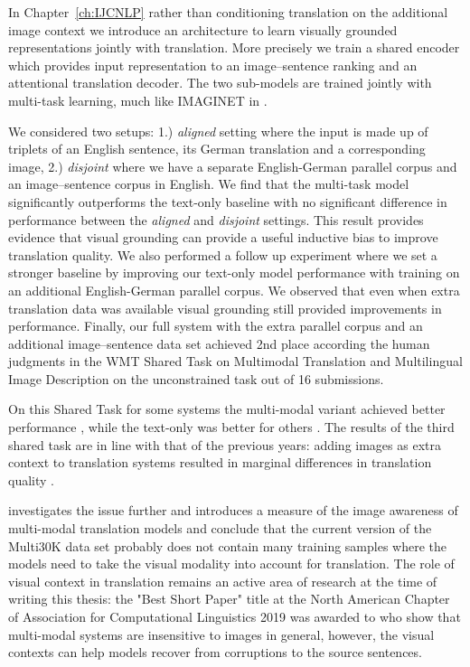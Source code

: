 In Chapter~\ref{ch:IJCNLP} rather than conditioning translation on the additional image context we 
introduce an architecture to learn visually grounded representations jointly with translation.
More precisely we train a shared
encoder which provides input representation to an image--sentence ranking and an
attentional translation decoder. The two sub-models are trained jointly with multi-task learning, much
like \textsc{IMAGINET} in \cite{chrupala2015learning}.

We considered two setups:
1.) \emph{aligned} setting where the input is made up of triplets of an English sentence, 
its German translation and a corresponding image, 2.) \emph{disjoint} where we have a
separate English-German parallel corpus and an image--sentence corpus in English.
We find that the multi-task model significantly outperforms the text-only baseline with
no significant difference in performance between the \emph{aligned} and \emph{disjoint}
settings. This result provides evidence that visual grounding can provide a useful inductive bias to 
improve translation quality. 
We also performed a follow up experiment where we set a stronger baseline by 
improving our text-only model performance with 
training on an additional English-German parallel corpus. We observed that even when
extra translation data was available visual grounding still provided improvements in performance.
Finally, our full system with the extra parallel corpus and an additional image--sentence data set achieved
2nd place according the human judgments in the WMT Shared Task on Multimodal Translation 
and Multilingual Image Description \citep{elliott2017findings} 
on the unconstrained task out of 16 submissions. 

On this Shared Task for some
systems the multi-modal variant achieved better performance
\citep{caglayan2017lium}, while the text-only was better for others \citep{ma2017osu}. 
The results of the third shared task are in line with that of the previous years:
adding images as extra context to translation systems resulted in marginal 
differences in translation quality \citep{barrault2018findings}.

\cite{elliott2018adversarial} investigates the issue further and introduces
a measure of the image awareness of multi-modal translation models and conclude that the current 
version of the Multi30K data set probably does not contain many training samples where the models 
need to take the visual modality into account for translation. The role of visual context in translation
remains an active area of research at the time of writing this thesis: the "Best Short Paper" title
at the North American Chapter of Association for Computational Linguistics 2019 was awarded to
\cite{caglayan2019probing} who show that multi-modal systems are insensitive to images in general, 
however, the visual contexts can help models recover from corruptions to the source sentences.



